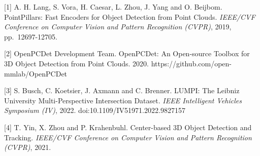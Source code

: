 \documentclass[
  10pt,
]{article}
\begin{document}
{[}1{]} A. H. Lang, S. Vora, H. Caesar, L. Zhou, J. Yang and O. Beijbom.
PointPillars: Fast Encoders for Object Detection from Point Clouds.
\emph{IEEE/CVF Conference on Computer Vision and Pattern Recognition
(CVPR)}, 2019, pp.~12697-12705.

{[}2{]} OpenPCDet Development Team. OpenPCDet: An Open-source Toolbox
for 3D Object Detection from Point Clouds. 2020.
https://github.com/open-mmlab/OpenPCDet

{[}3{]} S. Busch, C. Koetsier, J. Axmann and C. Brenner. LUMPI: The
Leibniz University Multi-Perspective Intersection Dataset. \emph{IEEE
Intelligent Vehicles Symposium (IV)}, 2022.
doi:10.1109/IV51971.2022.9827157

{[}4{]} T. Yin, X. Zhou and P. Krahenbuhl. Center-based 3D Object
Detection and Tracking. \emph{IEEE/CVF Conference on Computer Vision and
Pattern Recognition (CVPR)}, 2021.
\end{document}
